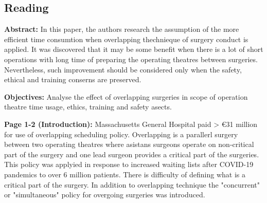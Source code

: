 \subsection{Reading}
    \textbf{Abstract:}
    In this paper, the authors research the assumption of the more efficient time consumtion when overlapping thechnieque of surgery conduct is applied. It was discovered that it may be some benefit when there is a lot of short operations with long time of preparing the operating theatres between surgeries. Nevertheless, such improvement should be considered only when the safety, ethical and training conserns are preserved. 
    
    \textbf{Objectives:}
    Analyse the effect of overlapping surgeries in scope of operation theatre time usage, ethics, training and safety asects.

    \textbf{Page 1-2 (Introduction):}
    Massachusetts General Hospital paid > €31 million for use of overlapping scheduling policy. Overlapping is a parallerl surgery between two operating theatres where asistans surgeons operate on non-critical part of the surgery and one lead surgeon provides a critical part of the surgeries. This policy was applyied in response to increased waiting lists after COVID-19 pandemics to over 6 million patients. There is difficulty of defining what is a critical part of the surgery. In addition to overlapping technique the "concurrent" or "simultaneous" policy for overgoing surgeries was introduced.
    
